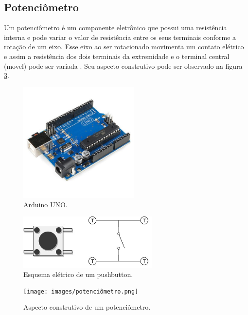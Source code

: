 \documentclass[conference]{IEEEtran}
\begin{document}
\subsection{Potenciômetro}
Um potenciômetro é um componente eletrônico que possui uma resistência interna e pode variar o valor de resistência entre os seus terminais conforme a rotação de um eixo. Esse eixo ao ser rotacionado  movimenta um contato elétrico e assim a resistência dos dois terminais da extremidade e o terminal central (movel) pode ser variada \cite{MasterWalkerPotenciometro}. Seu aspecto construtivo pode ser observado na figura \ref{fig:potenciometro}.

\begin{figure}[htbp]
\centerline{
    \includegraphics[width= 6cm]{images/arduino-uno.jpg}
    }
\caption{Arduino UNO.}
\label{fig:arduino}
\end{figure}

\begin{figure}[htbp]
\centerline{
    \includegraphics[width = 7cm]{images/Push-Button.jpg}
    }
\caption{Esquema elétrico de um pushbutton.}
\label{fig:pushbutton}
\end{figure}

\begin{figure}[htbp]
\centerline{
    \texttt{[image: images/potenciômetro.png]}
    }
\caption{Aspecto construtivo de um potenciômetro.}
\label{fig:potenciometro}
\end{figure}
\end{document}

